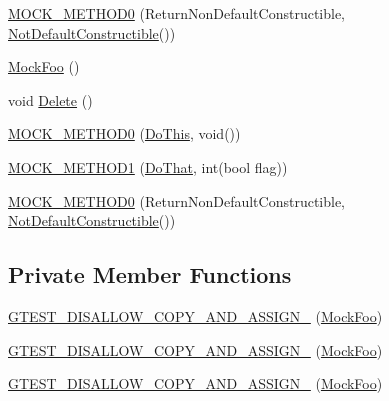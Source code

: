 \begin{DoxyCompactItemize}
\mbox{\hyperlink{classtesting_1_1gmock__nice__strict__test_1_1_mock_foo_a2d69a27a8789f04938cb1eb0047bb677}{M\+O\+C\+K\+\_\+\+M\+E\+T\+H\+O\+D0}} (Return\+Non\+Default\+Constructible, \mbox{\hyperlink{classtesting_1_1gmock__nice__strict__test_1_1_not_default_constructible}{Not\+Default\+Constructible}}())
\item 
\mbox{\hyperlink{classtesting_1_1gmock__nice__strict__test_1_1_mock_foo_a43a103497aa475d4b1700f5116b35ef3}{Mock\+Foo}} ()
\item 
void \mbox{\hyperlink{classtesting_1_1gmock__nice__strict__test_1_1_mock_foo_a7bdec6a6353e4396d551dbf8f2beac54}{Delete}} ()
\item 
\mbox{\hyperlink{classtesting_1_1gmock__nice__strict__test_1_1_mock_foo_a14ee661ebc461096824e876a9308840e}{M\+O\+C\+K\+\_\+\+M\+E\+T\+H\+O\+D0}} (\mbox{\hyperlink{classtesting_1_1gmock__nice__strict__test_1_1_foo_a79a3cdbd8d9d9f6bc87580563b0d7cec}{Do\+This}}, void())
\item 
\mbox{\hyperlink{classtesting_1_1gmock__nice__strict__test_1_1_mock_foo_a3a7bfcf303a2c8578db900c9525b02a1}{M\+O\+C\+K\+\_\+\+M\+E\+T\+H\+O\+D1}} (\mbox{\hyperlink{classtesting_1_1gmock__nice__strict__test_1_1_foo_a8527a459b03f333a809a3376311a9f8b}{Do\+That}}, int(bool flag))
\item 
\mbox{\hyperlink{classtesting_1_1gmock__nice__strict__test_1_1_mock_foo_a2d69a27a8789f04938cb1eb0047bb677}{M\+O\+C\+K\+\_\+\+M\+E\+T\+H\+O\+D0}} (Return\+Non\+Default\+Constructible, \mbox{\hyperlink{classtesting_1_1gmock__nice__strict__test_1_1_not_default_constructible}{Not\+Default\+Constructible}}())
\end{DoxyCompactItemize}
\subsection*{Private Member Functions}
\begin{DoxyCompactItemize}
\item 
\mbox{\hyperlink{classtesting_1_1gmock__nice__strict__test_1_1_mock_foo_aacaea4c9a9b61bcedfd21ee38c5bc143}{G\+T\+E\+S\+T\+\_\+\+D\+I\+S\+A\+L\+L\+O\+W\+\_\+\+C\+O\+P\+Y\+\_\+\+A\+N\+D\+\_\+\+A\+S\+S\+I\+G\+N\+\_\+}} (\mbox{\hyperlink{classtesting_1_1gmock__nice__strict__test_1_1_mock_foo}{Mock\+Foo}})
\item 
\mbox{\hyperlink{classtesting_1_1gmock__nice__strict__test_1_1_mock_foo_aacaea4c9a9b61bcedfd21ee38c5bc143}{G\+T\+E\+S\+T\+\_\+\+D\+I\+S\+A\+L\+L\+O\+W\+\_\+\+C\+O\+P\+Y\+\_\+\+A\+N\+D\+\_\+\+A\+S\+S\+I\+G\+N\+\_\+}} (\mbox{\hyperlink{classtesting_1_1gmock__nice__strict__test_1_1_mock_foo}{Mock\+Foo}})
\item 
\mbox{\hyperlink{classtesting_1_1gmock__nice__strict__test_1_1_mock_foo_aacaea4c9a9b61bcedfd21ee38c5bc143}{G\+T\+E\+S\+T\+\_\+\+D\+I\+S\+A\+L\+L\+O\+W\+\_\+\+C\+O\+P\+Y\+\_\+\+A\+N\+D\+\_\+\+A\+S\+S\+I\+G\+N\+\_\+}} (\mbox{\hyperlink{classtesting_1_1gmock__nice__strict__test_1_1_mock_foo}{Mock\+Foo}})
\end{DoxyCompactItemize}


